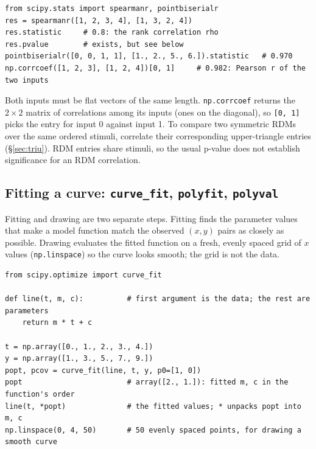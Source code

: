 \documentclass[11pt]{article}
\begin{document}
\begin{codebox}
\begin{verbatim}
from scipy.stats import spearmanr, pointbiserialr
res = spearmanr([1, 2, 3, 4], [1, 3, 2, 4])
res.statistic     # 0.8: the rank correlation rho
res.pvalue        # exists, but see below
pointbiserialr([0, 0, 1, 1], [1., 2., 5., 6.]).statistic   # 0.970
np.corrcoef([1, 2, 3], [1, 2, 4])[0, 1]     # 0.982: Pearson r of the two inputs
\end{verbatim}
\end{codebox}

Both inputs must be flat vectors of the same length. \texttt{np.corrcoef} returns the
$2 \times 2$ matrix of correlations among its inputs (ones on the diagonal), so
\texttt{[0, 1]} picks the entry for input 0 against input 1. To compare two symmetric
RDMs over the same ordered stimuli, correlate their corresponding upper-triangle entries
(\S\ref{sec:triu}). RDM entries share stimuli, so the usual p-value does not establish significance
for an RDM correlation.

\subsection{Fitting a curve: \texttt{curve\_fit}, \texttt{polyfit}, \texttt{polyval}}

Fitting and drawing are two separate steps. Fitting finds the parameter values that make a
model function match the observed $(x, y)$ pairs as closely as possible. Drawing evaluates
the fitted function on a fresh, evenly spaced grid of $x$ values (\texttt{np.linspace}) so
the curve looks smooth; the grid is not the data.

\begin{codebox}
\begin{verbatim}
from scipy.optimize import curve_fit

def line(t, m, c):          # first argument is the data; the rest are parameters
    return m * t + c

t = np.array([0., 1., 2., 3., 4.])
y = np.array([1., 3., 5., 7., 9.])
popt, pcov = curve_fit(line, t, y, p0=[1, 0])
popt                        # array([2., 1.]): fitted m, c in the function's order
line(t, *popt)              # the fitted values; * unpacks popt into m, c
np.linspace(0, 4, 50)       # 50 evenly spaced points, for drawing a smooth curve
\end{verbatim}
\end{codebox}
\end{document}

